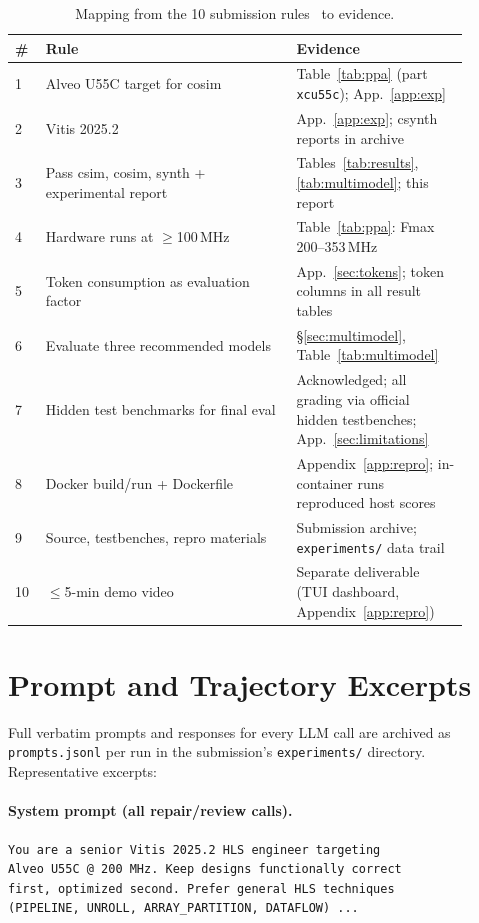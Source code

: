 \documentclass[10pt,conference,letterpaper]{IEEEtran}
\begin{document}
\begin{table}[h]
\centering
\caption{Mapping from the 10 submission rules~\cite{fpt26rules} to evidence.}
\label{tab:compliance}
\footnotesize
\begin{tabular}{p{0.06\linewidth} p{0.5\linewidth} p{0.34\linewidth}}
\toprule
\textbf{\#} & \textbf{Rule} & \textbf{Evidence} \\
\midrule
1 & Alveo U55C target for cosim & Table~\ref{tab:ppa} (part \texttt{xcu55c}); App.~\ref{app:exp} \\
2 & Vitis 2025.2 & App.~\ref{app:exp}; csynth reports in archive \\
3 & Pass csim, cosim, synth + experimental report & Tables~\ref{tab:results}, \ref{tab:multimodel}; this report \\
4 & Hardware runs at $\geq$100\,MHz & Table~\ref{tab:ppa}: Fmax 200--353\,MHz \\
5 & Token consumption as evaluation factor & App.~\ref{sec:tokens}; token columns in all result tables \\
6 & Evaluate three recommended models & \S\ref{sec:multimodel}, Table~\ref{tab:multimodel} \\
7 & Hidden test benchmarks for final eval & Acknowledged; all grading via official hidden testbenches; App.~\ref{sec:limitations} \\
8 & Docker build/run + Dockerfile & Appendix~\ref{app:repro}; in-container runs reproduced host scores \\
9 & Source, testbenches, repro materials & Submission archive; \texttt{experiments/} data trail \\
10 & $\leq$5-min demo video & Separate deliverable (TUI dashboard, Appendix~\ref{app:repro}) \\
\bottomrule
\end{tabular}
\end{table}

\section{Prompt and Trajectory Excerpts}
\label{app:prompts}

Full verbatim prompts and responses for every LLM call are archived as \texttt{prompts.jsonl} per run in the submission's \texttt{experiments/} directory. Representative excerpts:

\paragraph{System prompt (all repair/review calls).}
\begin{footnotesize}
\begin{verbatim}
You are a senior Vitis 2025.2 HLS engineer targeting
Alveo U55C @ 200 MHz. Keep designs functionally correct
first, optimized second. Prefer general HLS techniques
(PIPELINE, UNROLL, ARRAY_PARTITION, DATAFLOW) ...
\end{verbatim}
\end{footnotesize}
\end{document}
